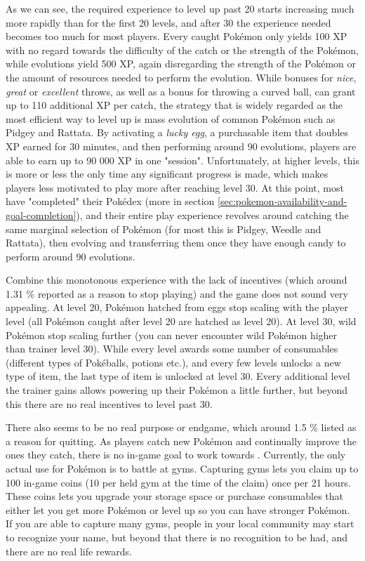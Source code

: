 As we can see, the required experience to level up past 20 starts increasing much more rapidly than for the first 20 levels, and after 30 the experience needed becomes too much for most players. Every caught Pokémon only yields 100 XP with no regard towards the difficulty of the catch or the strength of the Pokémon, while evolutions yield 500 XP, again disregarding the strength of the Pokémon or the amount of resources needed to perform the evolution. While bonuses for \emph{nice}, \emph{great} or \emph{excellent} throws, as well as a bonus for throwing a curved ball, can grant up to 110 additional XP per catch, the strategy that is widely regarded as the most efficient way to level up is mass evolution of common Pokémon such as Pidgey and Rattata. By activating a \emph{lucky egg}, a purchasable item that doubles XP earned for 30 minutes, and then performing around 90 evolutions, players are able to earn up to 90 000 XP in one "session". Unfortunately, at higher levels, this is more or less the only time any significant progress is made, which makes players less motivated to play more after reaching level 30. At this point, most have "completed" their Pokédex (more in section \ref{sec:pokemon-availability-and-goal-completion}), and their entire play experience revolves around catching the same marginal selection of Pokémon (for most this is Pidgey, Weedle and Rattata), then evolving and transferring them once they have enough candy to perform around 90 evolutions.

Combine this monotonous experience with the lack of incentives (which around 1.31 \% reported as a reason to stop playing) and the game does not sound very appealing. At level 20, Pokémon hatched from eggs stop scaling with the player level (all Pokémon caught after level 20 are hatched as level 20). At level 30, wild Pokémon stop scaling further (you can never encounter wild Pokémon higher than trainer level 30). While every level awards some number of consumables (different types of Pokéballs, potions etc.), and every few levels unlocks a new type of item, the last type of item is unlocked at level 30. Every additional level the trainer gains allows powering up their Pokémon a little further, but beyond this there are no real incentives to level past 30.

There also seems to be no real purpose or endgame, which around 1.5 \% listed as a reason for quitting. As players catch new Pokémon and continually improve the ones they catch, there is no in-game goal to work towards . Currently, the only actual use for Pokémon is to battle at gyms. Capturing gyms lets you claim up to 100 in-game coins (10 per held gym at the time of the claim) once per 21 hours. These coins lets you upgrade your storage space or purchase consumables that either let you get more Pokémon or level up so you can have stronger Pokémon. If you are able to capture many gyms, people in your local community may start to recognize your name, but beyond that there is no recognition to be had, and there are no real life rewards.

